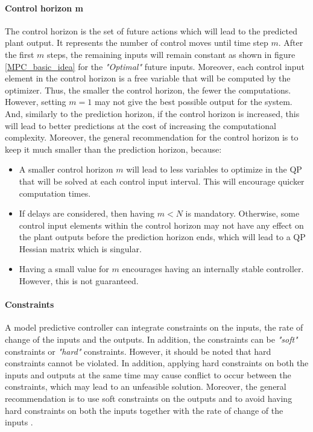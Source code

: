 \documentclass{thesisreport}
\begin{document}
\paragraph{Control horizon m}

The control horizon is the set of future actions which will lead to the predicted plant output. It represents the number of control moves until time step $m$. After the first $m$ steps, the remaining inputs will remain constant as shown in figure \ref{MPC_basic_idea} for the \textit{"Optimal"} future inputs. Moreover, each control input element in the control horizon is a free variable that will be computed by the optimizer. Thus, the smaller the control horizon, the fewer the computations. However, setting $m=1$ may not give the best possible output for the system. And, similarly to the prediction horizon, if the control horizon is increased, this will lead to better predictions at the cost of increasing the computational complexity. Moreover, the general recommendation for the control horizon is to keep it much smaller than the prediction horizon, because:

\begin{itemize}
	\item A smaller control horizon $m$ will lead to less variables to optimize in the QP that will be solved at each control input interval. This will encourage quicker computation times.
	\item If delays are considered, then having $m<N$ is mandatory. Otherwise, some control input elements within the control horizon  may not have any effect on the plant outputs before the prediction horizon ends, which will lead to a QP Hessian matrix which is singular. 
	\item Having a small value for $m$ encourages having an internally stable controller. However, this is not guaranteed.
\end{itemize}

\paragraph{Constraints} A model predictive controller can integrate constraints on the inputs, the rate of change of the inputs and the outputs. In addition, the constraints can be \textit{"soft"} constraints or \textit{"hard"} constraints. However, it should be noted that hard constraints cannot be violated. In addition, applying hard constraints on both the inputs and outputs at the same time may cause conflict to occur between the constraints, which may lead to an unfeasible solution. Moreover, the general recommendation is to use soft constraints on the outputs and to avoid having hard constraints on both the inputs together with the rate of change of the inputs .
\end{document}
